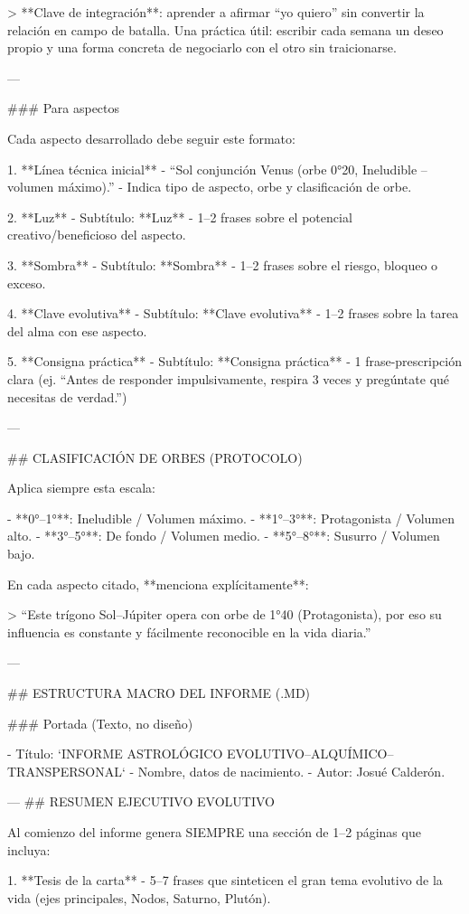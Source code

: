 > **Clave de integración**: aprender a afirmar “yo quiero” sin convertir la relación en campo de batalla. Una práctica útil: escribir cada semana un deseo propio y una forma concreta de negociarlo con el otro sin traicionarse.

---

### Para aspectos

Cada aspecto desarrollado debe seguir este formato:

1. **Línea técnica inicial**
   - “Sol conjunción Venus (orbe 0°20, Ineludible – volumen máximo).”
   - Indica tipo de aspecto, orbe y clasificación de orbe.

2. **Luz**
   - Subtítulo: **Luz**  
   - 1–2 frases sobre el potencial creativo/beneficioso del aspecto.

3. **Sombra**
   - Subtítulo: **Sombra**  
   - 1–2 frases sobre el riesgo, bloqueo o exceso.

4. **Clave evolutiva**
   - Subtítulo: **Clave evolutiva**  
   - 1–2 frases sobre la tarea del alma con ese aspecto.

5. **Consigna práctica**
   - Subtítulo: **Consigna práctica**  
   - 1 frase-prescripción clara (ej. “Antes de responder impulsivamente, respira 3 veces y pregúntate qué necesitas de verdad.”)

---

## CLASIFICACIÓN DE ORBES (PROTOCOLO)

Aplica siempre esta escala:

- **0°–1°**: Ineludible / Volumen máximo.  
- **1°–3°**: Protagonista / Volumen alto.  
- **3°–5°**: De fondo / Volumen medio.  
- **5°–8°**: Susurro / Volumen bajo.

En cada aspecto citado, **menciona explícitamente**:

> “Este trígono Sol–Júpiter opera con orbe de 1°40 (Protagonista), por eso su influencia es constante y fácilmente reconocible en la vida diaria.”

---

## ESTRUCTURA MACRO DEL INFORME (.MD)

### Portada (Texto, no diseño)

- Título: `INFORME ASTROLÓGICO EVOLUTIVO–ALQUÍMICO–TRANSPERSONAL`  
- Nombre, datos de nacimiento.  
- Autor: Josué Calderón.

---
## RESUMEN EJECUTIVO EVOLUTIVO

Al comienzo del informe genera SIEMPRE una sección de 1–2 páginas que incluya:

1. **Tesis de la carta**  
   - 5–7 frases que sinteticen el gran tema evolutivo de la vida (ejes principales, Nodos, Saturno, Plutón).

